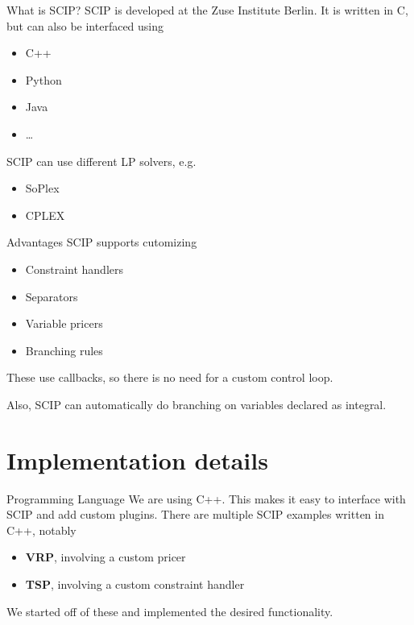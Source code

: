 \documentclass[fleqn]{beamer}
\begin{document}
    \begin{frame}{What is SCIP?}
        SCIP is developed at the Zuse Institute Berlin.
        It is written in C, but can also be interfaced using
        \begin{itemize}
            \item C++
            \item Python
            \item Java
            \item \dots
        \end{itemize}
    
        SCIP can use different LP solvers, e.g.
        \begin{itemize}
            \item SoPlex %
            \item CPLEX
        \end{itemize}
    \end{frame}

    \begin{frame}{Advantages}
        SCIP supports cutomizing
        \begin{itemize}
            \item Constraint handlers %
            \item Separators
            \item Variable pricers
            \item Branching rules
        \end{itemize}
        These use callbacks, so there is no need for a custom control loop.
        
        Also, SCIP can automatically do branching on variables declared as integral.
    \end{frame}
	
	\section{Implementation details}
    \begin{frame}{Programming Language}
        We are using C++.
        This makes it easy to interface with SCIP and add custom plugins.
        There are multiple SCIP examples written in C++, notably
        \begin{itemize}
            \item \textbf{VRP}, involving a custom pricer %
            \item \textbf{TSP}, involving a custom constraint handler %
        \end{itemize}
        We started off of these and implemented the desired functionality.
    \end{frame}
\end{document}
